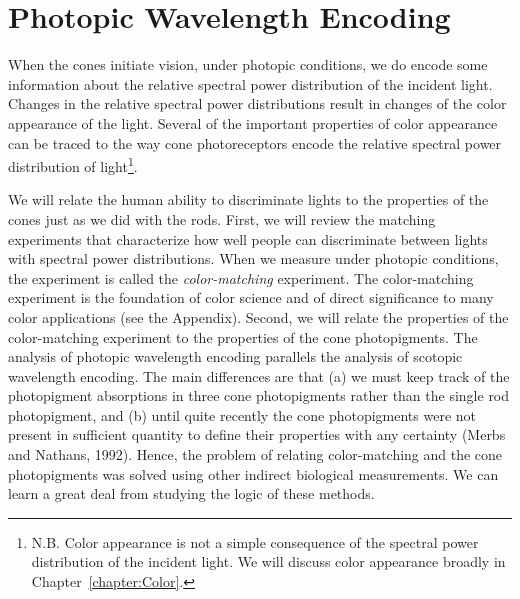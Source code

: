 \section{Photopic Wavelength Encoding}
When the cones initiate vision,
under photopic conditions,
we do encode some information about
the relative spectral power distribution of the incident light.
Changes in the relative spectral power distributions
result in changes of the color appearance of the light.
Several of the important properties of
color appearance can be traced
to the way cone photoreceptors
encode the relative spectral power distribution of light\footnote{
N.B. Color appearance is not a simple consequence
of the spectral power distribution of the incident light.
We will discuss color appearance broadly in
Chapter~\ref{chapter:Color}.
}.

We will relate the human ability to discriminate
lights to the properties of the cones
just as we did with the rods.
First, we will review the matching experiments
that characterize how well people
can discriminate between lights
with spectral power distributions.
When we measure under photopic conditions, the
experiment is called the {\em color-matching} experiment.
The color-matching experiment is the 
foundation of color science and of direct significance
to many color applications (see the Appendix).
Second, we will relate the properties of the
color-matching experiment to the properties of the
cone photopigments.
The analysis of photopic wavelength encoding
parallels the analysis of scotopic wavelength encoding.
The main differences are that (a) we must keep track of the
photopigment absorptions in three cone photopigments
rather than the single rod photopigment, and (b) 
until quite recently
the cone photopigments were not present
in sufficient quantity to define
their properties with any certainty (Merbs and Nathans, 1992).
Hence, the problem of relating color-matching and the
cone photopigments was solved using
other indirect biological measurements.
We can learn a great deal from studying the logic
of these methods.

